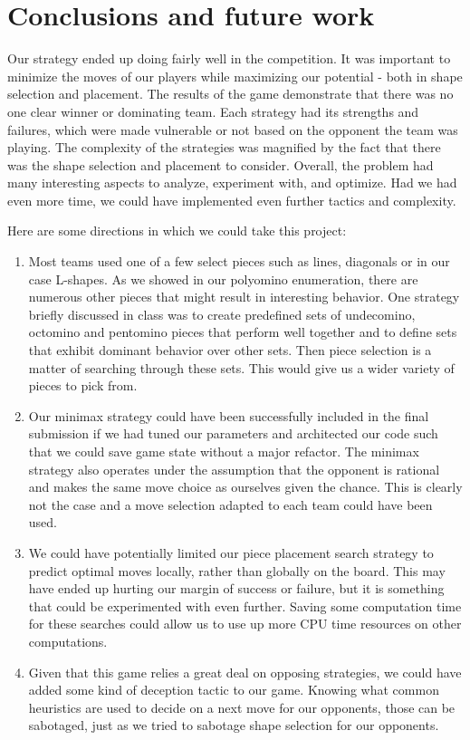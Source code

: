 \documentclass{scrartcl}
\begin{document}
\section{Conclusions and future work} %
Our strategy ended up doing fairly well in the competition. It was important to minimize the moves of our players while maximizing our potential - both in shape selection and placement. The results of the game demonstrate that there was no one clear winner or dominating team. Each strategy had its strengths and failures, which were made vulnerable or not based on the opponent the team was playing. The complexity of the strategies was magnified by the fact that there was the shape selection and placement to consider. Overall, the problem had many interesting aspects to analyze, experiment with, and optimize. Had we had even more time, we could have implemented even further tactics and complexity.

Here are some directions in which we could take this project:

\begin{enumerate}
\item Most teams used one of a few select pieces such as lines, diagonals or in our case L-shapes. As we showed in our polyomino enumeration, there are numerous other pieces that might result in interesting behavior. One strategy briefly discussed in class was to create predefined sets of undecomino, octomino and pentomino pieces that perform well together and to define sets that exhibit dominant behavior over other sets. Then piece selection is a matter of searching through these sets. This would give us a wider variety of pieces to pick from.
\item Our minimax strategy could have been successfully included in the final submission if we had tuned our parameters and architected our code such that we could save game state without a major refactor. The minimax strategy also operates under the assumption that the opponent is rational and makes the same move choice as ourselves given the chance. This is clearly not the case and a move selection adapted to each team could have been used.
\item We could have potentially limited our piece placement search strategy to predict optimal moves locally, rather than globally on the board. This may have ended up hurting our margin of success or failure, but it is something that could be experimented with even further. Saving some computation time for these searches could allow us to use up more CPU time resources on other computations.
\item Given that this game relies a great deal on opposing strategies, we could have added some kind of deception tactic to our game. Knowing what common heuristics are used to decide on a next move for our opponents, those can be sabotaged, just as we tried to sabotage shape selection for our opponents.
\end{enumerate}
\end{document}
